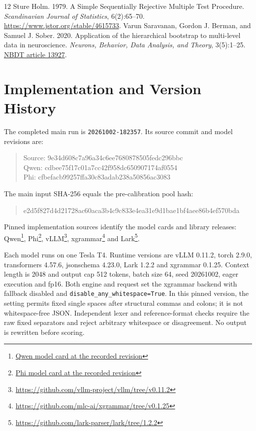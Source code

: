 \documentclass[11pt]{article}
\begin{document}
\begin{thebibliography}{12}
 Sture Holm. 1979. A Simple Sequentially Rejective Multiple Test Procedure. \emph{Scandinavian Journal of Statistics}, 6(2):65--70. \url{https://www.jstor.org/stable/4615733}.
 Varun Saravanan, Gordon J. Berman, and Samuel J. Sober. 2020. Application of the hierarchical bootstrap to multi-level data in neuroscience. \emph{Neurons, Behavior, Data Analysis, and Theory}, 3(5):1--25. \href{https://nbdt.scholasticahq.com/article/13927-application-of-the-hierarchical-bootstrap-to-multi-level-data-in-neuroscience}{NBDT article 13927}.
\end{thebibliography}

\clearpage\appendix
\section{Implementation and Version History}\label{app:implementation}
The completed main run is \texttt{20261002-182357}. Its source commit and model revisions are:
\begin{quote}\small\ttfamily
Source: 9e34d608c7a96a34c6ee7680878505fedc296bbc\\
Qwen: cdbee75f17c01a7cc42f958dc650907174af0554\\
Phi: cfbefacb99257ffa30c83adab238a50856ac3083
\end{quote}
The main input SHA-256 equals the pre-calibration pool hash:
\begin{quote}\footnotesize\ttfamily
e2d5f827d4d21728ac60aca3b4c9c833e4ea31e9d1bae1bf4aee86b4ef570bda
\end{quote}

Pinned implementation sources identify the model cards and library releases: Qwen\footnote{\href{https://huggingface.co/Qwen/Qwen3-4B-Instruct-2507/blob/cdbee75f17c01a7cc42f958dc650907174af0554/README.md}{Qwen model card at the recorded revision}}, Phi\footnote{\href{https://huggingface.co/microsoft/Phi-4-mini-instruct/blob/cfbefacb99257ffa30c83adab238a50856ac3083/README.md}{Phi model card at the recorded revision}}, vLLM\footnote{\url{https://github.com/vllm-project/vllm/tree/v0.11.2}}, xgrammar\footnote{\url{https://github.com/mlc-ai/xgrammar/tree/v0.1.25}} and Lark\footnote{\url{https://github.com/lark-parser/lark/tree/1.2.2}}.

Each model runs on one Tesla T4. Runtime versions are vLLM 0.11.2, torch 2.9.0, transformers 4.57.6, jsonschema 4.23.0, Lark 1.2.2 and xgrammar 0.1.25. Context length is 2048 and output cap 512 tokens, batch size 64, seed 20261002, eager execution and fp16. Both engine and request set the xgrammar backend with fallback disabled and \texttt{disable\_any\_whitespace=True}. In this pinned version, the setting permits fixed single spaces after structural commas and colons; it is not whitespace-free JSON. Independent lexer and reference-format checks require the raw fixed separators and reject arbitrary whitespace or disagreement. No output is rewritten before scoring.
\end{document}
